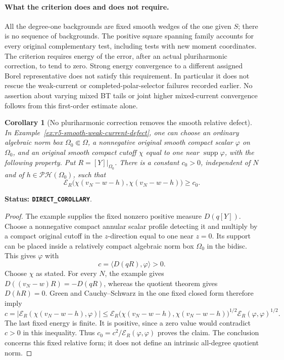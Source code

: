 \documentclass[11pt,a4paper]{article}
\numberwithin{equation}{section}
\newtheorem{corollary}[theorem]{Corollary}
\theoremstyle{definition}
\theoremstyle{remark}
\begin{document}
\paragraph{What the criterion does and does not require.}
All the degree-one backgrounds are fixed smooth wedges of
the one given $S$; there is no sequence of backgrounds.
The positive square spanning family accounts for every
original complementary test, including tests with new
moment coordinates. The criterion requires energy of the
error, after an actual pluriharmonic correction, to tend
to zero. Strong energy convergence to a different assigned
Borel representative does not satisfy this requirement.
In particular it does not rescue the weak-current or
completed-polar-selector failures recorded earlier.
No assertion about varying mixed BT tails or joint
higher mixed-current convergence follows from this
first-order estimate alone.

\begin{corollary}[No pluriharmonic correction removes the smooth relative defect]
\label{cor:r5-no-ph-energy-repair}
In Example~\ref{ex:r5-smooth-weak-current-defect}, one can
choose an ordinary algebraic norm box $\Omega_0\Subset\Omega$,
a nonnegative original smooth compact scalar $\varphi$ on
$\Omega_0$, and an original smooth compact cutoff $\chi$
equal to one near $\operatorname{supp}\varphi$, with the
following property. Put $R=[Y]|_{\Omega_0}$. There is a
constant $c_0>0$, independent of $N$ and of
$h\in\mathscr{PH}(\Omega_0)$, such that
\[
 \mathcal E_R\bigl(\chi(v_N-w-h),\chi(v_N-w-h)\bigr)
                              \geq c_0.
\]
\end{corollary}

\noindent\textbf{Status: \texttt{DIRECT\_COROLLARY}}.

\begin{proof}
The example supplies the fixed nonzero positive measure
$D(q[Y])$. Choose a nonnegative compact annular scalar
profile detecting it and multiply by a compact original
cutoff in the $z$-direction equal to one near $z=0$.
Its support can be placed inside a relatively compact
algebraic norm box $\Omega_0$ in the bidisc. This gives
$\varphi$ with
\[
                        c=\langle D(qR),\varphi\rangle>0.
\]
Choose $\chi$ as stated. For every $N$, the example gives
$D((v_N-w)R)=-D(qR)$, whereas the quotient theorem gives
$D(hR)=0$. Green and Cauchy--Schwarz in the one fixed
closed form therefore imply
\[
 c=\bigl|\mathcal E_R(\chi(v_N-w-h),\varphi)\bigr|
 \leq
 \mathcal E_R\bigl(\chi(v_N-w-h),\chi(v_N-w-h)\bigr)^{1/2}
 \mathcal E_R(\varphi,\varphi)^{1/2}.
\]
The last fixed energy is finite. It is positive, since a
zero value would contradict $c>0$ in this inequality.
Thus $c_0=c^2/\mathcal E_R(\varphi,\varphi)$ proves the
claim. The conclusion concerns this fixed relative form;
it does not define an intrinsic all-degree quotient norm.
\end{proof}
\end{document}

